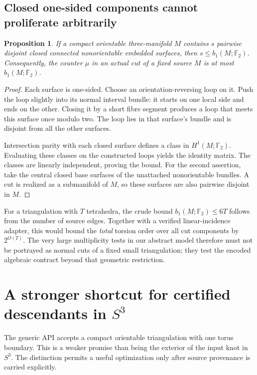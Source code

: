 \documentclass[11pt]{article}
\newtheorem{proposition}[theorem]{Proposition}
\theoremstyle{definition}
\theoremstyle{remark}
\newcommand{\F}{\mathbb F_2}
\begin{document}
\subsection{Closed one-sided components cannot proliferate arbitrarily}
\begin{proposition}
\label{prop:one-sided}
If a compact orientable three-manifold $M$ contains $s$ pairwise disjoint
closed connected nonorientable embedded surfaces, then
$s\leq b_1(M;\F)$. Consequently, the counter $\mu$ in an actual cut of a
fixed source $M$ is at most $b_1(M;\F)$.
\end{proposition}
\begin{proof}
Each surface is one-sided. Choose an orientation-reversing loop on it.
Push the loop slightly into its normal interval bundle: it starts on one
local side and ends on the other. Closing it by a short fibre segment
produces a loop that meets this surface once modulo two. The loop lies in
that surface's bundle and is disjoint from all the other surfaces.

Intersection parity with each closed surface defines a class in
$H^1(M;\F)$. Evaluating these classes on the constructed loops yields the
identity matrix. The classes are linearly independent, proving the bound.
For the second assertion, take the central closed base surfaces of the
unattached nonorientable bundles. A cut is realized as a submanifold of
$M$, so these surfaces are also pairwise disjoint in $M$.
\end{proof}

For a triangulation with $T$ tetrahedra, the crude bound
$b_1(M;\F)\leq6T$ follows from the number of source edges. Together with a
verified linear-incidence adapter, this would bound the \emph{total}
torsion order over all cut components by $2^{O(T)}$. The very large
multiplicity tests in our abstract model therefore must not be portrayed as
normal cuts of a fixed small triangulation; they test the encoded algebraic
contract beyond that geometric restriction.

\section{A stronger shortcut for certified descendants in \texorpdfstring{$S^3$}{S3}}
\label{sec:s3}

The generic API accepts a compact orientable triangulation with one torus
boundary. This is a weaker promise than being the exterior of the input knot
in $S^3$. The distinction permits a useful optimization only after source
provenance is carried explicitly.
\end{document}
